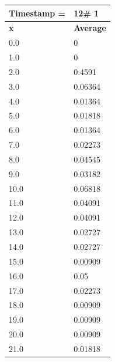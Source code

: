 \begin{tabular}{|l||l|}
\hline
\textbf{Timestamp =} & \textbf{12}\# 1\\\hline
	\textbf{x} & \textbf{Average} \\ \hline
\hline
	0.0 & 0 \\ \hline
	1.0 & 0 \\ \hline
	2.0 & 0.4591 \\ \hline
	3.0 & 0.06364 \\ \hline
	4.0 & 0.01364 \\ \hline
	5.0 & 0.01818 \\ \hline
	6.0 & 0.01364 \\ \hline
	7.0 & 0.02273 \\ \hline
	8.0 & 0.04545 \\ \hline
	9.0 & 0.03182 \\ \hline
	10.0 & 0.06818 \\ \hline
	11.0 & 0.04091 \\ \hline
	12.0 & 0.04091 \\ \hline
	13.0 & 0.02727 \\ \hline
	14.0 & 0.02727 \\ \hline
	15.0 & 0.00909 \\ \hline
	16.0 & 0.05 \\ \hline
	17.0 & 0.02273 \\ \hline
	18.0 & 0.00909 \\ \hline
	19.0 & 0.00909 \\ \hline
	20.0 & 0.00909 \\ \hline
	21.0 & 0.01818 \\ \hline
\end{tabular}
